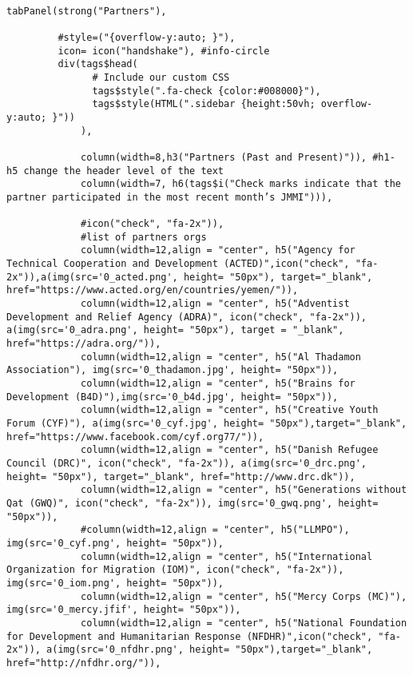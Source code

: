 \documentclass[
]{article}
\begin{document}
\begin{verbatim}

tabPanel(strong("Partners"),
         
         #style=("{overflow-y:auto; }"), 
         icon= icon("handshake"), #info-circle
         div(tags$head(
               # Include our custom CSS
               tags$style(".fa-check {color:#008000}"),
               tags$style(HTML(".sidebar {height:50vh; overflow-y:auto; }"))
             ),
             
             column(width=8,h3("Partners (Past and Present)")), #h1- h5 change the header level of the text
             column(width=7, h6(tags$i("Check marks indicate that the partner participated in the most recent month’s JMMI"))),
             
             #icon("check", "fa-2x")),
             #list of partners orgs
             column(width=12,align = "center", h5("Agency for Technical Cooperation and Development (ACTED)",icon("check", "fa-2x")),a(img(src='0_acted.png', height= "50px"), target="_blank", href="https://www.acted.org/en/countries/yemen/")),
             column(width=12,align = "center", h5("Adventist Development and Relief Agency (ADRA)", icon("check", "fa-2x")), a(img(src='0_adra.png', height= "50px"), target = "_blank", href="https://adra.org/")),
             column(width=12,align = "center", h5("Al Thadamon Association"), img(src='0_thadamon.jpg', height= "50px")),
             column(width=12,align = "center", h5("Brains for Development (B4D)"),img(src='0_b4d.jpg', height= "50px")),
             column(width=12,align = "center", h5("Creative Youth Forum (CYF)"), a(img(src='0_cyf.jpg', height= "50px"),target="_blank", href="https://www.facebook.com/cyf.org77/")),
             column(width=12,align = "center", h5("Danish Refugee Council (DRC)", icon("check", "fa-2x")), a(img(src='0_drc.png', height= "50px"), target="_blank", href="http://www.drc.dk")),
             column(width=12,align = "center", h5("Generations without Qat (GWQ)", icon("check", "fa-2x")), img(src='0_gwq.png', height= "50px")),
             #column(width=12,align = "center", h5("LLMPO"), img(src='0_cyf.png', height= "50px")),
             column(width=12,align = "center", h5("International Organization for Migration (IOM)", icon("check", "fa-2x")), img(src='0_iom.png', height= "50px")),
             column(width=12,align = "center", h5("Mercy Corps (MC)"), img(src='0_mercy.jfif', height= "50px")),
             column(width=12,align = "center", h5("National Foundation for Development and Humanitarian Response (NFDHR)",icon("check", "fa-2x")), a(img(src='0_nfdhr.png', height= "50px"),target="_blank", href="http://nfdhr.org/")),

\end{verbatim}
\end{document}
